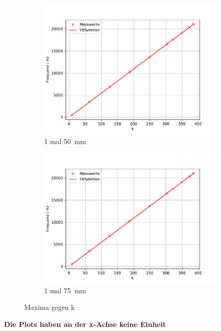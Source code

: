 \begin{figure}
 \centering
 \begin{subfigure}{0.48\textwidth}
  \centering
  \includegraphics[width=1\textwidth]{A6.pdf}
  \caption{1 mal \SI{50}{mm}}
  \label{fig.Aufgabe6}
 \end{subfigure}
 \begin{subfigure}{0.48\textwidth}
  \centering
  \includegraphics[width=1\textwidth]{A7.pdf}
  \caption{1 mal \SI{75}{mm}}
  \label{fig.Aufgabe7}
 \end{subfigure}
 \caption{Maxima gegen k}
\end{figure}
\textbf{\huge{Die Plots haben an der x-Achse keine Einheit}}

